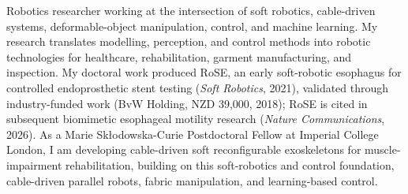 Robotics researcher working at the intersection of soft robotics, cable-driven systems, deformable-object manipulation, control, and machine learning. My research translates modelling, perception, and control methods into robotic technologies for healthcare, rehabilitation, garment manufacturing, and inspection. My doctoral work produced RoSE, an early soft-robotic esophagus for controlled endoprosthetic stent testing (\textit{Soft Robotics}, 2021), validated through industry-funded work (BvW Holding, NZD 39,000, 2018); RoSE is cited in subsequent biomimetic esophageal motility research (\textit{Nature Communications}, 2026). As a Marie Skłodowska-Curie Postdoctoral Fellow at Imperial College London, I am developing cable-driven soft reconfigurable exoskeletons for muscle-impairment rehabilitation, building on this soft-robotics and control foundation, cable-driven parallel robots, fabric manipulation, and learning-based control.



